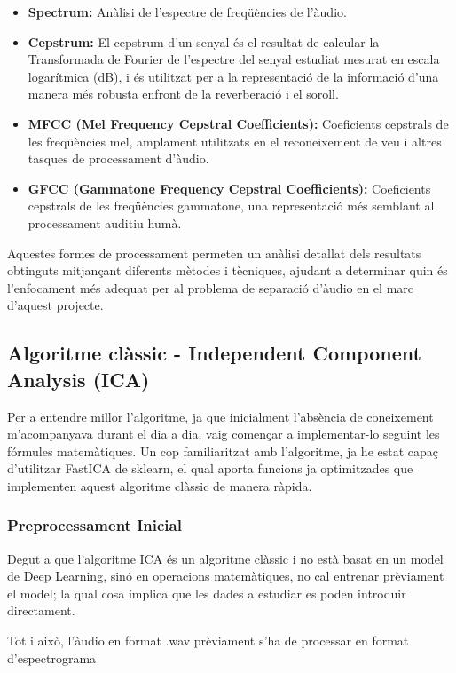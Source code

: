 \documentclass[10pt,a4paper,twocolumn,twoside]{article}
\begin{document}
\begin{itemize}
\item \textbf{Spectrum:} Anàlisi de l'espectre de freqüències de l'àudio.
\item \textbf{Cepstrum:} El cepstrum d'un senyal és el resultat de calcular la Transformada de Fourier de l'espectre del senyal estudiat mesurat en escala logarítmica (dB), i és utilitzat per a la representació de la informació d'una manera més robusta enfront de la reverberació i el soroll.
\item \textbf{MFCC (Mel Frequency Cepstral Coefficients):} Coeficients cepstrals de les freqüències mel, amplament utilitzats en el reconeixement de veu i altres tasques de processament d'àudio.
\item \textbf{GFCC (Gammatone Frequency Cepstral Coefficients):} Coeficients cepstrals de les freqüències gammatone, una representació més semblant al processament auditiu humà.
\end{itemize}

Aquestes formes de processament permeten un anàlisi detallat dels resultats obtinguts mitjançant diferents mètodes i tècniques, ajudant a determinar quin és l'enfocament més adequat per al problema de separació d'àudio en el marc d'aquest projecte.

\subsection{Algoritme clàssic - Independent Component Analysis (ICA)}

Per a entendre millor l'algoritme, ja que inicialment l'absència de coneixement m'acompanyava durant el dia a dia, vaig començar a implementar-lo seguint les fórmules matemàtiques.
Un cop familiaritzat amb l'algoritme, ja he estat capaç d'utilitzar FastICA \cite{langlois2010introduction} de sklearn, el qual aporta funcions ja optimitzades que implementen aquest algoritme clàssic de manera ràpida. 

\subsubsection{Preprocessament Inicial}

Degut a que l'algoritme ICA és un algoritme clàssic i no està basat en un model de Deep Learning, sinó en operacions matemàtiques, no cal entrenar prèviament el model; la qual cosa implica que les dades a estudiar es poden introduir directament.

Tot i això, l'àudio en format .wav prèviament s'ha de processar en format d'espectrograma
\end{document}
